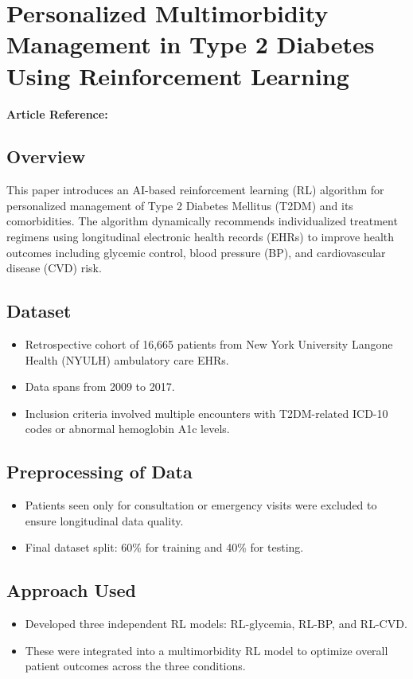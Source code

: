 \section{Personalized Multimorbidity Management in Type 2 Diabetes Using Reinforcement Learning}
\textbf{Article Reference:} \cite{article_18}

\subsection*{Overview}
This paper introduces an AI-based reinforcement learning (RL) algorithm for personalized management of Type 2 Diabetes Mellitus (T2DM) and its comorbidities. The algorithm dynamically recommends individualized treatment regimens using longitudinal electronic health records (EHRs) to improve health outcomes including glycemic control, blood pressure (BP), and cardiovascular disease (CVD) risk.

\subsection*{Dataset}
\begin{itemize}
    \item Retrospective cohort of 16,665 patients from New York University Langone Health (NYULH) ambulatory care EHRs.
    \item Data spans from 2009 to 2017.
    \item Inclusion criteria involved multiple encounters with T2DM-related ICD-10 codes or abnormal hemoglobin A1c levels.
\end{itemize}

\subsection*{Preprocessing of Data}
\begin{itemize}
    \item Patients seen only for consultation or emergency visits were excluded to ensure longitudinal data quality.
    \item Final dataset split: 60\% for training and 40\% for testing.
\end{itemize}

\subsection*{Approach Used}
\begin{itemize}
    \item Developed three independent RL models: RL-glycemia, RL-BP, and RL-CVD.
    \item These were integrated into a multimorbidity RL model to optimize overall patient outcomes across the three conditions.
\end{itemize}

